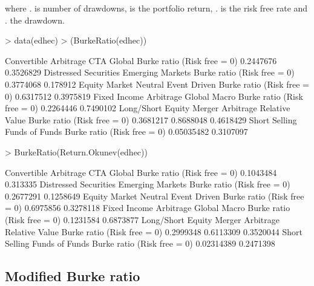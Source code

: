 \documentclass[12pt,letterpaper,english]{article}
\begin{document}

where . is number of drawdowns,  is the portfolio return, . is the risk free rate and . the  drawdown.

\begin{Schunk}
\begin{Sinput}
> data(edhec)
> (BurkeRatio(edhec)) 
\end{Sinput}
\begin{Soutput}
                            Convertible Arbitrage CTA Global
Burke ratio (Risk free = 0)             0.2447676  0.3526829
                            Distressed Securities Emerging Markets
Burke ratio (Risk free = 0)             0.3774068         0.178912
                            Equity Market Neutral Event Driven
Burke ratio (Risk free = 0)             0.6317512    0.3975819
                            Fixed Income Arbitrage Global Macro
Burke ratio (Risk free = 0)              0.2264446    0.7490102
                            Long/Short Equity Merger Arbitrage Relative Value
Burke ratio (Risk free = 0)         0.3681217        0.8688048      0.4618429
                            Short Selling Funds of Funds
Burke ratio (Risk free = 0)    0.05035482      0.3107097
\end{Soutput}
\begin{Sinput}
> BurkeRatio(Return.Okunev(edhec))
\end{Sinput}
\begin{Soutput}
                            Convertible Arbitrage CTA Global
Burke ratio (Risk free = 0)             0.1043484   0.313335
                            Distressed Securities Emerging Markets
Burke ratio (Risk free = 0)             0.2677291        0.1258649
                            Equity Market Neutral Event Driven
Burke ratio (Risk free = 0)             0.6975856    0.3278118
                            Fixed Income Arbitrage Global Macro
Burke ratio (Risk free = 0)              0.1231584    0.6873877
                            Long/Short Equity Merger Arbitrage Relative Value
Burke ratio (Risk free = 0)         0.2999348        0.6113309      0.3520044
                            Short Selling Funds of Funds
Burke ratio (Risk free = 0)    0.02314389      0.2471398
\end{Soutput}
\end{Schunk}

\subsection{Modified Burke ratio}
\end{document}
